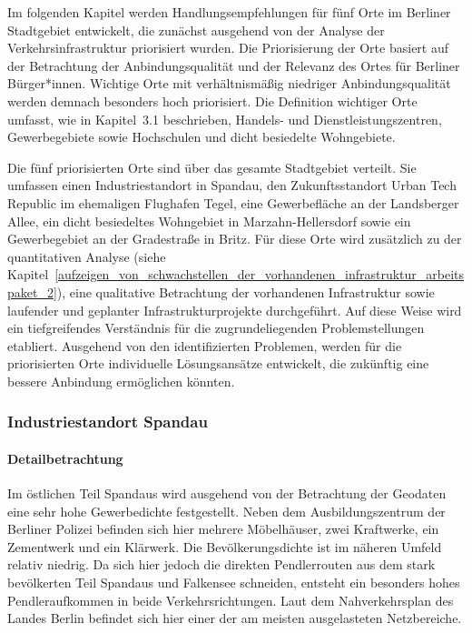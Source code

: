 Im folgenden Kapitel werden Handlungsempfehlungen für fünf Orte im Berliner Stadtgebiet entwickelt, die zunächst ausgehend von der Analyse der Verkehrsinfrastruktur priorisiert wurden. Die Priorisierung der Orte basiert auf der Betrachtung der Anbindungsqualität und der Relevanz des Ortes für Berliner Bürger*innen. Wichtige Orte mit verhältnismäßig niedriger Anbindungsqualität werden demnach besonders hoch priorisiert. Die Definition wichtiger Orte umfasst, wie in Kapitel~3.1 beschrieben, Handels- und Dienstleistungszentren, Gewerbegebiete sowie Hochschulen und dicht besiedelte Wohngebiete.

Die fünf priorisierten Orte sind über das gesamte Stadtgebiet verteilt. Sie umfassen einen Industriestandort in Spandau, den Zukunftsstandort Urban Tech Republic im ehemaligen Flughafen Tegel, eine Gewerbefläche an der Landsberger Allee, ein dicht besiedeltes Wohngebiet in Marzahn-Hellersdorf sowie ein Gewerbegebiet an der Gradestraße in Britz. Für diese Orte wird zusätzlich zu der quantitativen Analyse (siehe Kapitel~\ref{aufzeigen_von_schwachstellen_der_vorhandenen_infrastruktur_arbeitspaket_2}), eine qualitative Betrachtung der vorhandenen Infrastruktur sowie laufender und geplanter Infrastrukturprojekte durchgeführt. Auf diese Weise wird ein tiefgreifendes Verständnis für die zugrundeliegenden Problemstellungen etabliert. Ausgehend von den identifizierten Problemen, werden für die priorisierten Orte individuelle Lösungsansätze entwickelt, die zukünftig eine bessere Anbindung ermöglichen könnten.

\subsubsection{Industriestandort Spandau}

\paragraph{Detailbetrachtung}

Im östlichen Teil Spandaus wird ausgehend von der Betrachtung der Geodaten eine sehr hohe Gewerbedichte festgestellt. Neben dem Ausbildungszentrum der Berliner Polizei befinden sich hier mehrere Möbelhäuser, zwei Kraftwerke, ein Zementwerk und ein Klärwerk. Die Bevölkerungsdichte ist im näheren Umfeld relativ niedrig. Da sich hier jedoch die direkten Pendlerrouten aus dem stark bevölkerten Teil Spandaus und Falkensee schneiden, entsteht ein besonders hohes Pendleraufkommen in beide Verkehrsrichtungen. Laut dem Nahverkehrsplan des Landes Berlin befindet sich hier einer der am meisten ausgelasteten Netzbereiche.

